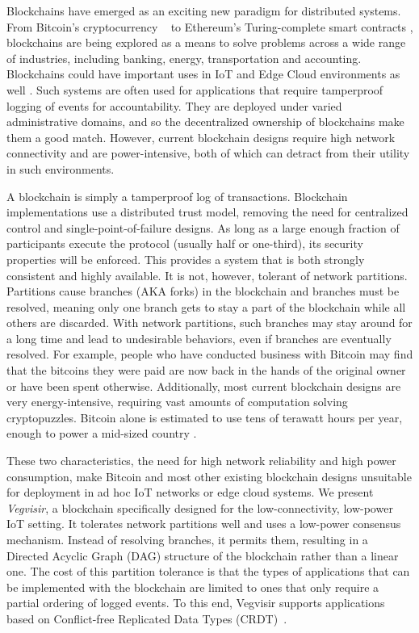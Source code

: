 \documentclass[conference, letterpaper]{IEEEtran}
\begin{document}
Blockchains have emerged as an exciting new paradigm for distributed systems. From Bitcoin's cryptocurrency ~\cite{nakamoto_bitcoin:_2008} to Ethereum's Turing-complete smart contracts \cite{wood_ethereum:_2017}, blockchains are being explored as a means to solve problems across a wide range of industries, including banking, energy, transportation and accounting. Blockchains could have important uses in IoT and Edge Cloud environments as well \cite{christidis2016blockchains}.  Such systems are often used for applications that require tamperproof logging of events for accountability.  They are deployed under varied administrative domains, and so the decentralized ownership of blockchains make them a good match.  However, current blockchain designs require high network connectivity and are power-intensive, both of which can detract from their utility in such environments.

A blockchain is simply a tamperproof log of transactions.  Blockchain implementations use a distributed trust model, removing the need for centralized control and single-point-of-failure designs. As long as a large enough fraction of participants execute the protocol (usually half or one-third), its security properties will be enforced. This provides a system that is both  strongly consistent and highly available. It is not, however, tolerant of network partitions. Partitions cause branches (AKA forks) in the blockchain and branches must be resolved, meaning only one branch gets to stay a part of the blockchain while all others are discarded. With network partitions, such branches may stay around for a long time and lead to undesirable behaviors, even if branches are eventually resolved.  For example, people who have conducted business with Bitcoin may find that the bitcoins they were paid are now back in the hands of the original owner or have been spent otherwise.
Additionally, most current blockchain designs are very energy-intensive, requiring vast amounts of computation solving cryptopuzzles. Bitcoin alone is estimated to use tens of terawatt hours per year, enough to power a mid-sized country \cite{o2014bitcoin, beall_bitcoin_2017}. 

These two characteristics, the need for high network reliability and high power consumption, make Bitcoin and most other existing blockchain designs unsuitable for deployment in ad hoc IoT networks or edge cloud systems.  We present \emph{Vegvisir}, a blockchain specifically designed for the low-connectivity, low-power IoT setting. It tolerates network partitions well and uses a low-power consensus mechanism. Instead of resolving branches, it permits them, resulting in a Directed Acyclic Graph (DAG) structure of the blockchain rather than a linear one. The cost of this partition tolerance is that the types of applications that can be implemented with the blockchain are limited to ones that only require a partial ordering of logged events. To this end, Vegvisir supports applications based on Conflict-free Replicated Data Types (CRDT)~\cite{syn:rep:sh143}.
\end{document}
